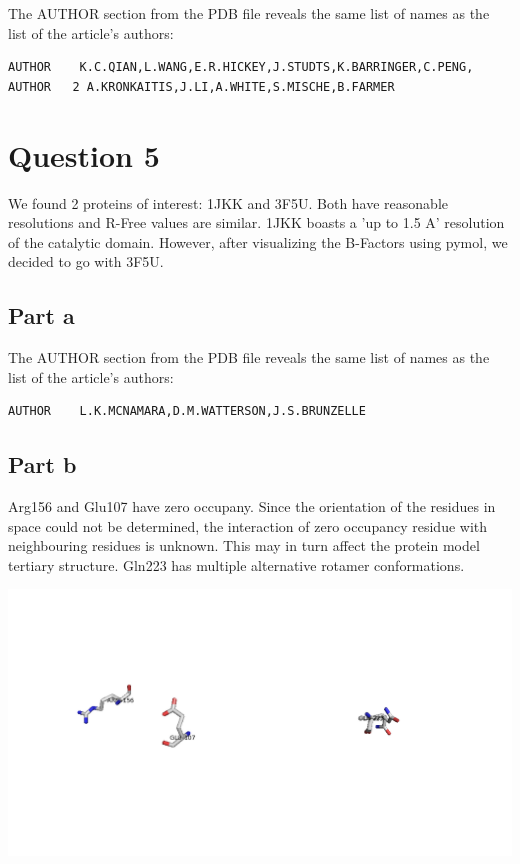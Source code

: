 \documentclass[11pt, a4paper,titlepage]{article}
\begin{document}
The AUTHOR section from the PDB file reveals the same list of names as
the list of the article's authors:

\begin{verbatim}
AUTHOR    K.C.QIAN,L.WANG,E.R.HICKEY,J.STUDTS,K.BARRINGER,C.PENG,               
AUTHOR   2 A.KRONKAITIS,J.LI,A.WHITE,S.MISCHE,B.FARMER         
\end{verbatim}
 
\section*{Question 5}
We found 2 proteins of interest: 1JKK and 3F5U. Both have reasonable
resolutions and R-Free values are similar. 1JKK boasts a 'up to 1.5 A'
resolution of the catalytic domain. However, after visualizing the
B-Factors using pymol, we decided to go with 3F5U.

\subsection*{Part a}

The AUTHOR section from the PDB file reveals the same list of names as
the list of the article's authors:

\begin{verbatim}
AUTHOR    L.K.MCNAMARA,D.M.WATTERSON,J.S.BRUNZELLE
\end{verbatim}

\subsection*{Part b}

Arg156 and Glu107 have zero occupany. Since the orientation of the
residues in space could not be determined, the interaction of zero
occupancy residue with neighbouring residues is unknown. This may in
turn affect the protein model tertiary structure.  Gln223 has multiple
alternative rotamer conformations.

\includegraphics[width=15cm]{./Figures/5b.png}
\end{document}
